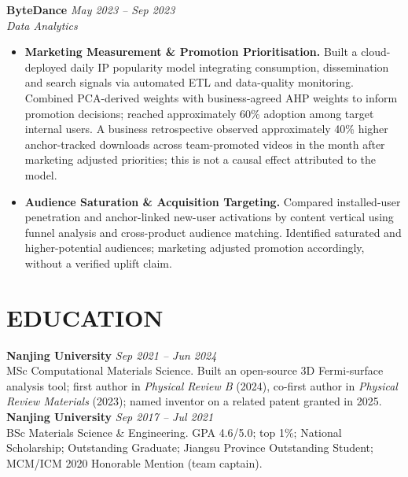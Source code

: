 \documentclass[a4paper,10pt]{article}
\begin{document}
\textbf{ByteDance} \hfill \textit{May 2023 -- Sep 2023}\\
\textit{Data Analytics}
\begin{itemize}
\item \textbf{Marketing Measurement \& Promotion Prioritisation.} Built a cloud-deployed daily IP popularity model integrating consumption, dissemination and search signals via automated ETL and data-quality monitoring. Combined PCA-derived weights with business-agreed AHP weights to inform promotion decisions; reached approximately 60\% adoption among target internal users. A business retrospective observed approximately 40\% higher anchor-tracked downloads across team-promoted videos in the month after marketing adjusted priorities; this is not a causal effect attributed to the model.
\item \textbf{Audience Saturation \& Acquisition Targeting.} Compared installed-user penetration and anchor-linked new-user activations by content vertical using funnel analysis and cross-product audience matching. Identified saturated and higher-potential audiences; marketing adjusted promotion accordingly, without a verified uplift claim.
\end{itemize}

\section{EDUCATION}
\textbf{Nanjing University} \hfill \textit{Sep 2021 -- Jun 2024}\\
MSc Computational Materials Science. Built an open-source 3D Fermi-surface analysis tool; first author in \textit{Physical Review B} (2024), co-first author in \textit{Physical Review Materials} (2023); named inventor on a related patent granted in 2025.\\[1pt]
\textbf{Nanjing University} \hfill \textit{Sep 2017 -- Jul 2021}\\
BSc Materials Science \& Engineering. GPA 4.6/5.0; top 1\%; National Scholarship; Outstanding Graduate; Jiangsu Province Outstanding Student; MCM/ICM 2020 Honorable Mention (team captain).
\end{document}
